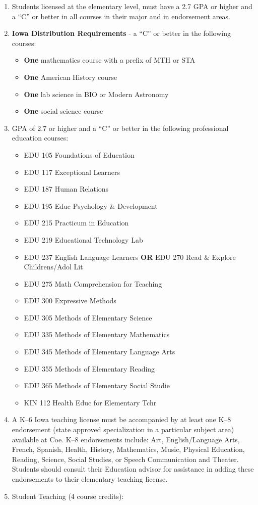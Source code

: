 \documentclass[
  letterpaper,
]{scrbook}
\providecommand{\tightlist}{%
  \setlength{\itemsep}{0pt}\setlength{\parskip}{0pt}}
\begin{document}
\begin{enumerate}
\def\labelenumi{\arabic{enumi}.}
\tightlist
\item
  Students licensed at the elementary level, must have a 2.7 GPA or
  higher and a ``C'' or better in all courses in their major and in
  endorsement areas.
\item
  \textbf{Iowa Distribution Requirements} - a ``C'' or better in the
  following courses:

  \begin{itemize}
  \tightlist
  \item
    \textbf{One} mathematics course with a prefix of MTH or STA
  \item
    \textbf{One} American History course
  \item
    \textbf{One} lab science in BIO or Modern Astronomy
  \item
    \textbf{One} social science course
  \end{itemize}
\item
  GPA of 2.7 or higher and a ``C'' or better in the following
  professional education courses:

  \begin{itemize}
  \tightlist
  \item
    EDU 105 Foundations of Education
  \item
    EDU 117 Exceptional Learners
  \item
    EDU 187 Human Relations
  \item
    EDU 195 Educ Psychology \& Development
  \item
    EDU 215 Practicum in Education
  \item
    EDU 219 Educational Technology Lab
  \item
    EDU 237 English Language Learners \textbf{OR} EDU 270 Read \&
    Explore Childrens/Adol Lit
  \item
    EDU 275 Math Comprehension for Teaching
  \item
    EDU 300 Expressive Methods
  \item
    EDU 305 Methods of Elementary Science
  \item
    EDU 335 Methods of Elementary Mathematics
  \item
    EDU 345 Methods of Elementary Language Arts
  \item
    EDU 355 Methods of Elementary Reading
  \item
    EDU 365 Methods of Elementary Social Studie
  \item
    KIN 112 Health Educ for Elementary Tchr
  \end{itemize}
\item
  A K--6 Iowa teaching license must be accompanied by at least one K--8
  endorsement (state approved specialization in a particular subject
  area) available at Coe. K--8 endorsements include: Art,
  English/Language Arts, French, Spanish, Health, History, Mathematics,
  Music, Physical Education, Reading, Science, Social Studies, or Speech
  Communication and Theater. Students should consult their Education
  advisor for assistance in adding these endorsements to their
  elementary teaching license.
\item
  Student Teaching (4 course credits):


\end{enumerate}
\end{document}
